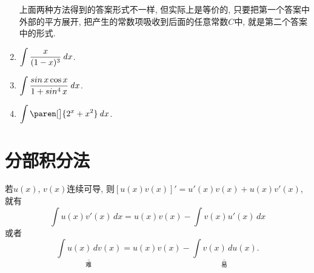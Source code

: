 \documentclass[a4paper,punct=CCT]{ctexbook}
\newcommand*{\mreason}[1]{#1}
\newcommand*{\disp}[1]{\( \displaystyle #1 \)}
\theoremstyle{definition}
\theoremstyle{remark}
\newif\ifshowsol
\begin{document}
\begin{enumerate}
  上面两种方法得到的答案形式不一样, 但实际上是等价的, 只要把第一个答案中外部的平方展开, 把产生的常数项吸收到后面的任意常数\(C\)中, 就是第二个答案中的形式.
  \fi

\item \disp{\int \frac{x}{(1-x)^3} \dx}.

  \ifshowsol
  尝试使用\(u = 1/(1-x)^2\)和\(t = 1/(1-x)\)来做换元, 观察到
  \[
    \du = \frac{2}{(1-x)^3} \dx
    \quad \text{和} \quad
    \dt = \frac{1}{(1-x)^2} \dx,
  \]
  所以有
  \begin{align*}
    \int \frac{x}{(1-x)^3} \dx
    &= \int \paren[\bigg]{\frac{x-1}{(1-x)^3} + \frac{1}{(1-x)^3}} \dx \\
    &= - \int \frac{1}{(1-x)^2} \dx + \int \frac{1}{(1-x)^3} \dx \\
    &= - \int \dt + \frac12 \int \du \\
    &= - t + \frac u2 + C \\
    &= - \frac1{1-x} + \frac1{2 (1-x)^2} + C.
  \end{align*}
  \fi

\item \disp{\int \frac{\sin x \cos x}{1 + \sin^4 x} \dx}.

  \ifshowsol
  使用\(u = \sin x\)和\(t = u^2\)来做换元, 就有
  \begin{align*}
    \int \frac{\sin x \cos x}{1 + \sin^4 x} \dx
    &= \int \frac{u}{1+u^4} \du
    && \mreason{\du = \cos x \dx} \\
    &= \frac12 \int \frac1{1+t^2} \dt
    && \mreason{\dt = 2u \du} \\
    &= \frac12 \arctan t + C \\
    &= \frac12 \arctan \sin^2 x + C
    && \mreason{t = u^2,\ u = \sin x}
  \end{align*}
  \fi

\item \disp{\int \paren[\big]{2^x + x^2} \dx}.

  \ifshowsol
  \[
    \int \paren[\big]{2^x + x^2} \dx
    = \int 2^x \dx + \int x^2 \dx
    = \frac{2^x}{\ln 2} + \frac{x^3}3 + C.
  \]
  \fi
\end{enumerate}
\fi

\section{分部积分法}

若$u(x)$, $v(x)$连续可导, 则$[u(x) v(x)]' = u'(x)v(x) + u(x)v'(x)$, 就有
\[
  \int u(x) v'(x) \, dx = u(x) v(x) - \int v(x) u'(x) \, dx
\]
或者
\[
  \underset{\text{难}}{\underline{\int u(x) \, dv(x)}} =
  u(x) v(x) - \underset{\text{易}}{\underline{\int v(x) \, du(x)}}.
\]
\end{document}
